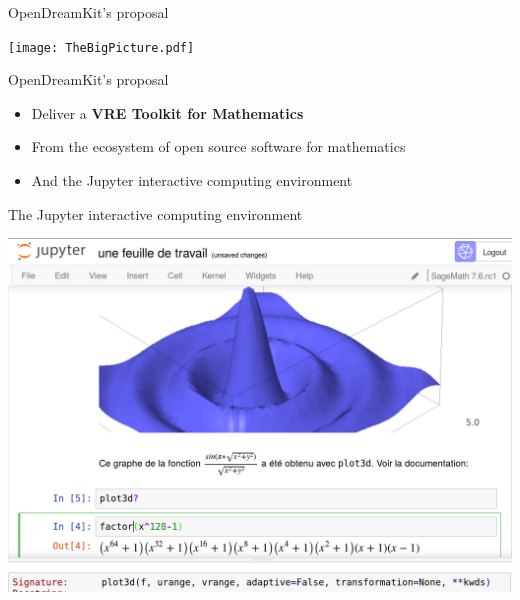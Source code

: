 \documentclass{beamer}
\begin{document}

\begin{frame}{OpenDreamKit's proposal}\label{our-proposal}
  \centerline{\texttt{[image: TheBigPicture.pdf]}}
\end{frame}

\begin{frame}{OpenDreamKit's proposal}\label{our-proposal}
  \begin{itemize}
  \item Deliver a \textbf{VRE Toolkit for Mathematics}
  \item From the ecosystem of open source software for mathematics
  \item And the Jupyter interactive computing environment
  \end{itemize}
\end{frame}

\begin{frame}{The Jupyter interactive computing environment}
  \centerline{\includegraphics[height=.8\textheight]{worksheet.png}}
\end{frame}
\end{document}
